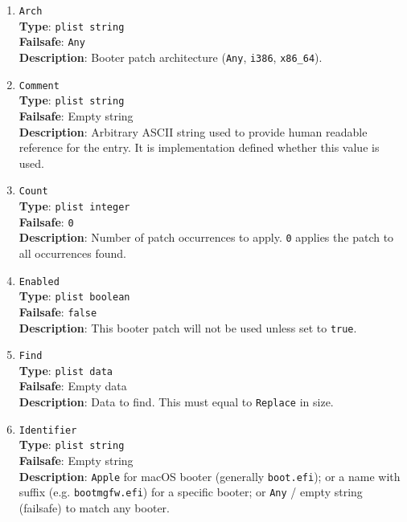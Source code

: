 \documentclass[]{article}
\begin{document}
\begin{enumerate}
\item
  \texttt{Arch}\\
  \textbf{Type}: \texttt{plist\ string}\\
  \textbf{Failsafe}: \texttt{Any}\\
  \textbf{Description}: Booter patch architecture (\texttt{Any}, \texttt{i386}, \texttt{x86\_64}).

\item
  \texttt{Comment}\\
  \textbf{Type}: \texttt{plist\ string}\\
  \textbf{Failsafe}: Empty string\\
  \textbf{Description}: Arbitrary ASCII string used to provide human readable
  reference for the entry. It is implementation defined whether this value is
  used.

\item
  \texttt{Count}\\
  \textbf{Type}: \texttt{plist\ integer}\\
  \textbf{Failsafe}: \texttt{0}\\
  \textbf{Description}: Number of patch occurrences to apply. \texttt{0} applies
  the patch to all occurrences found.

\item
  \texttt{Enabled}\\
  \textbf{Type}: \texttt{plist\ boolean}\\
  \textbf{Failsafe}: \texttt{false}\\
  \textbf{Description}: This booter patch will not be used unless set to
  \texttt{true}.

\item
  \texttt{Find}\\
  \textbf{Type}: \texttt{plist\ data}\\
  \textbf{Failsafe}: Empty data\\
  \textbf{Description}: Data to find. This must equal to \texttt{Replace} in size.

\item
  \texttt{Identifier}\\
  \textbf{Type}: \texttt{plist\ string}\\
  \textbf{Failsafe}: Empty string\\
  \textbf{Description}: \texttt{Apple} for macOS booter (generally \texttt{boot.efi});
  or a name with suffix (e.g. \texttt{bootmgfw.efi}) for a specific booter;
  or \texttt{Any} / empty string (failsafe) to match any booter.


\end{enumerate}
\end{document}
